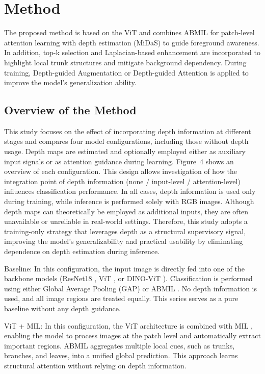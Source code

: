 \section{Method}

The proposed method is based on the ViT \cite{ref1} and combines ABMIL \cite{ref2} for patch-level attention learning with depth estimation (MiDaS) \cite{ref3} to guide foreground awareness. In addition, top-k selection and Laplacian-based enhancement are incorporated to highlight local trunk structures and mitigate background dependency. During training, Depth-guided Augmentation or Depth-guided Attention is applied to improve the model’s generalization ability.

\subsection{Overview of the Method}
This study focuses on the effect of incorporating depth information at different stages and compares four model configurations, including those without depth usage. Depth maps are estimated and optionally employed either as auxiliary input signals or as attention guidance during learning. Figure~4 shows an overview of each configuration. This design allows investigation of how the integration point of depth information (none / input-level / attention-level) influences classification performance. In all cases, depth information is used only during training, while inference is performed solely with RGB images. Although depth maps can theoretically be employed as additional inputs, they are often unavailable or unreliable in real-world settings. Therefore, this study adopts a training-only strategy that leverages depth as a structural supervisory signal, improving the model’s generalizability and practical usability by eliminating dependence on depth estimation during inference.

\noindent Baseline:\quad
In this configuration, the input image is directly fed into one of the backbone models (ResNet18 \cite{ref12}, ViT \cite{ref1}, or DINO-ViT \cite{ref13}). Classification is performed using either Global Average Pooling (GAP) or ABMIL \cite{ref2}. No depth information is used, and all image regions are treated equally. This series serves as a pure baseline without any depth guidance.

\noindent ViT + MIL:\quad
In this configuration, the ViT architecture \cite{ref1} is combined with MIL \cite{ref2}, enabling the model to process images at the patch level and automatically extract important regions. ABMIL aggregates multiple local cues, such as trunks, branches, and leaves, into a unified global prediction. This approach learns structural attention without relying on depth information.

